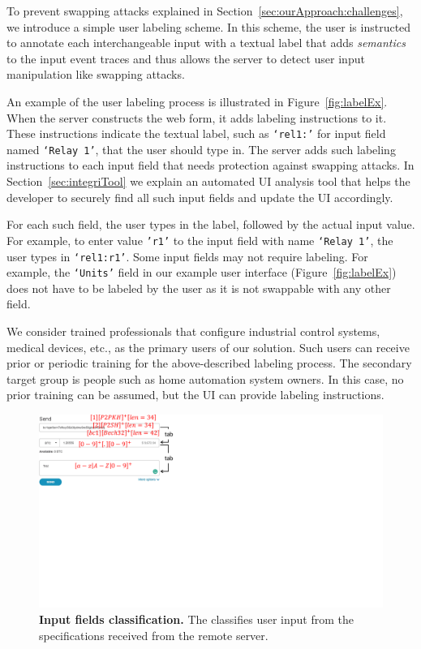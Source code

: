 To prevent swapping attacks explained in Section~\ref{sec:ourApproach:challenges}, we introduce a simple user labeling scheme. In this scheme, the user is instructed to annotate each interchangeable input with a textual label that adds \emph{semantics} to the input event traces and thus allows the server to detect user input manipulation like swapping attacks.

An example of the user labeling process is illustrated in Figure~\ref{fig:labelEx}. When the server constructs the web form, it adds labeling instructions to it. These instructions indicate the textual label, such as \texttt{`rel1:'} for input field named \texttt{`Relay 1'}, that the user should type in. The server adds such labeling instructions to each input field that needs protection against swapping attacks. In Section~\ref{sec:integriTool} we explain an automated UI analysis tool that helps the developer to securely find all such input fields and update the UI accordingly.

For each such field, the user types in the label, followed by the actual input value. For example, to enter value \texttt{'r1'} to the input field with name \texttt{`Relay 1'}, the user types in \texttt{`rel1:r1'}. Some input fields may not require labeling. For example, the \texttt{`Units'} field in our example user interface (Figure~\ref{fig:labelEx}) does not have to be labeled by the user as it is not swappable with any other field.

We consider trained professionals that configure industrial control systems, medical devices, etc., as the primary users of our solution. Such users can receive prior or periodic training for the above-described labeling process. The secondary target group is people such as home automation system owners. In this case, no prior training can be assumed, but the UI can provide labeling instructions.


\iffalse
\begin{figure}[t]
 \centering
 \includegraphics[trim={0 12cm 20cm 0},clip,width=0.8\linewidth]{chapters/IntegriKey/images/InputClassify.pdf}
 \caption{\textbf{Input fields classification.} The \device classifies user input from the specifications received from the remote server.} \vspace{-20pt}
 \label{fig:inputClassification}
\end{figure}

